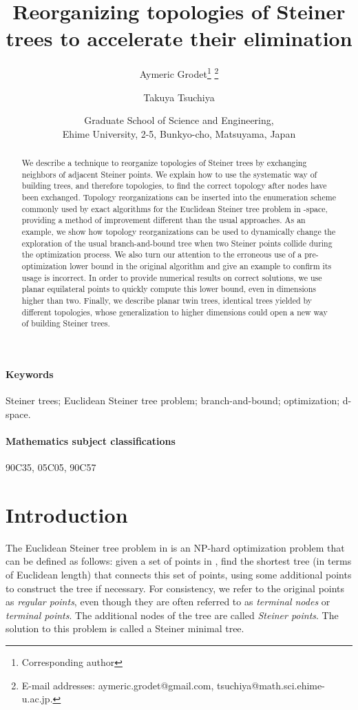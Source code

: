 \documentclass{article}
\title{Reorganizing topologies of Steiner trees to accelerate their elimination}
\author{
  Aymeric Grodet\thanks{Corresponding author} \thanks{E-mail addresses: aymeric.grodet@gmail.com,
    tsuchiya@math.sci.ehime-u.ac.jp.}
  \and
  Takuya Tsuchiya\footnotemark[2]
}
\date{Graduate School of Science and Engineering, \\Ehime University, 2-5, Bunkyo-cho, Matsuyama, Japan}
\theoremstyle{plain}
\begin{document}
\maketitle

\begin{abstract}
We describe a technique to reorganize topologies of Steiner trees by exchanging neighbors of adjacent Steiner points. 
We explain how to use the systematic way of building trees, and therefore topologies, to find the correct topology after nodes have been exchanged. 
Topology reorganizations can be inserted into the enumeration scheme commonly used by exact algorithms for the Euclidean Steiner tree problem in -space, providing a method of improvement different than the usual approaches. 
As an example, we show how topology reorganizations can be used to dynamically change the exploration of the usual branch-and-bound tree when two Steiner points collide during the optimization process. 
We also turn our attention to the erroneous use of a pre-optimization lower bound in the original algorithm and give an example to confirm its usage is incorrect.
In order to provide numerical results on correct solutions, we use planar equilateral points to quickly compute this lower bound, even in dimensions higher than two. 
Finally, we describe planar twin trees, identical trees yielded by different topologies, whose generalization to higher dimensions could open a new way of building Steiner trees.
\end{abstract}

\paragraph{Keywords}Steiner trees; Euclidean Steiner tree problem; branch-and-bound; optimization; d-space.

\paragraph{Mathematics subject classifications}90C35, 05C05, 90C57








\section{Introduction}

The Euclidean Steiner tree problem in  is an NP-hard optimization problem \cite{Garey} that can be defined as follows: given a set of points in , find the shortest tree (in terms of Euclidean length) that connects this set of points, using some additional points to construct the tree if necessary. 
For consistency, we refer to the original points as \emph{regular points}, even though they are often referred to as \emph{terminal nodes} or \emph{terminal points}. 
The additional nodes of the tree are called \emph{Steiner points}. 
The solution to this problem is called a Steiner minimal tree. 
\end{document}
